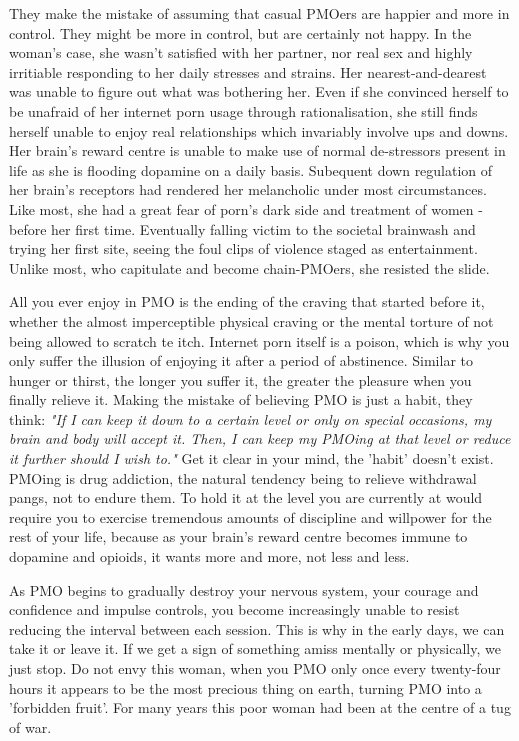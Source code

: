 \documentclass[easypeasy]{subfiles}
\begin{document}
They make the mistake of assuming that casual PMOers are happier and more in control. They might be more in control, but are certainly not happy. In the woman's case, she wasn't satisfied with her partner, nor real sex and highly irritiable responding to her daily stresses and strains. Her nearest-and-dearest was unable to figure out what was bothering her. Even if she convinced herself to be unafraid of her internet porn usage through rationalisation, she still finds herself unable to enjoy real relationships which invariably involve ups and downs. Her brain's reward centre is unable to make use of normal de-stressors present in life as she is flooding dopamine on a daily basis. Subequent down regulation of her brain's receptors had rendered her melancholic under most circumstances. Like most, she had a great fear of porn's dark side and treatment of women - before her first time. Eventually falling victim to the societal brainwash and trying her first site, seeing the foul clips of violence staged as entertainment. Unlike most, who capitulate and become chain-PMOers, she resisted the slide.

All you ever enjoy in PMO is the ending of the craving that started before it, whether the almost imperceptible physical craving or the mental torture of not being allowed to scratch te itch. Internet porn itself is a poison, which is why you only suffer the illusion of enjoying it after a period of abstinence. Similar to hunger or thirst, the longer you suffer it, the greater the pleasure when you finally relieve it. Making the mistake of believing PMO is just a habit, they think: \textit{"If I can keep it down to a certain level or only on special occasions, my brain and body will accept it. Then, I can keep my PMOing at that level or reduce it further should I wish to."} Get it clear in your mind, the 'habit' doesn't exist. PMOing is drug addiction, the natural tendency being to relieve withdrawal pangs, not to endure them. To hold it at the level you are currently at would require you to exercise tremendous amounts of discipline and willpower for the rest of your life, because as your brain's reward centre becomes immune to dopamine and opioids, it wants more and more, not less and less. 

As PMO begins to gradually destroy your nervous system, your courage and confidence and impulse controls, you become increasingly unable to resist reducing the interval between each session. This is why in the early days, we can take it or leave it. If we get a sign of something amiss mentally or physically, we just stop. Do not envy this woman, when you PMO only once every twenty-four hours it appears to be the most precious thing on earth, turning PMO into a 'forbidden fruit'. For many years this poor woman had been at the centre of a tug of war.
\end{document}

